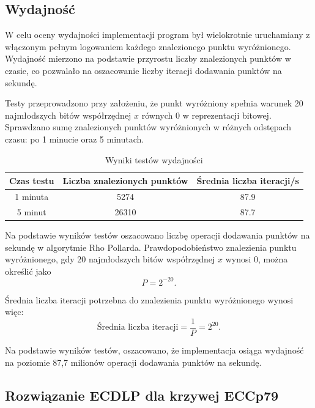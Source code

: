 \subsection{Wydajność}

W celu oceny wydajności implementacji program był wielokrotnie uruchamiany z
włączonym pełnym logowaniem każdego znalezionego punktu wyróżnionego. Wydajność
mierzono na podstawie przyrostu liczby znalezionych punktów w czasie, co pozwalało
na oszacowanie liczby iteracji dodawania punktów na sekundę.

Testy przeprowadzono przy założeniu, że punkt wyróżniony spełnia warunek 20
najmłodszych bitów współrzędnej $x$ równych $0$ w reprezentacji bitowej.
Sprawdzano sumę znalezionych punktów wyróżnionych w różnych odstępach czasu:
po 1 minucie oraz 5 minutach.

\begin{table}[h!]
    \centering
    \caption{Wyniki testów wydajności}
    \begin{tabular}{|c|c|c|}
        \hline
        \textbf{Czas testu} & \textbf{Liczba znalezionych punktów} &
        \textbf{Średnia liczba iteracji/s}                                \\ \hline
        1 minuta            & 5274                                 & 87.9 \\ \hline
        5 minut             & 26310                                & 87.7 \\ \hline
    \end{tabular}
    \label{tab:performance}
\end{table}

Na podstawie wyników testów oszacowano liczbę operacji dodawania punktów na
sekundę w algorytmie Rho Pollarda. Prawdopodobieństwo znalezienia punktu wyróżnionego,
gdy 20 najmłodszych bitów współrzędnej $x$ wynosi $0$, można określić jako
$$
    P = 2^{-20}.
$$

Średnia liczba iteracji potrzebna do znalezienia punktu wyróżnionego wynosi
więc:
$$
    \text{Średnia liczba iteracji} = \frac{1}{P} = 2^{20}.
$$

Na podstawie wyników testów, oszacowano, że implementacja osiąga wydajność na
poziomie 87,7 milionów operacji dodawania punktów na sekundę.

\subsection{Rozwiązanie ECDLP dla krzywej ECCp79}


